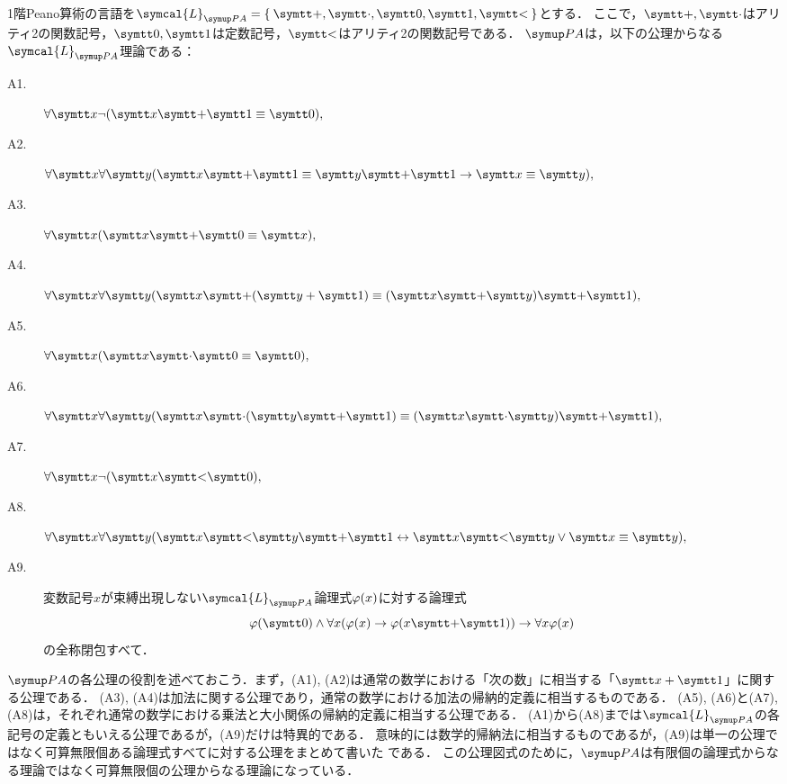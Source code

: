 \begin{Def} \label{Def:peanoarithmetic}
	1階Peano算術の言語を\(\symcal{L}_{\PA} = \Set{\obj{+}, \obj{\cdot}, \obj{0}, \obj{1}, \obj{<}}\)とする．
	ここで，\(\obj{+}, \obj{\cdot}\)はアリティ2の関数記号，\(\obj{0}, \obj{1}\)は定数記号，\(\obj{<}\)はアリティ2の関数記号である．
	\(\PA\)は，以下の公理からなる\(\symcal{L}_{\PA}\)理論である：
	\begin{description}
		\item[A1.] \(\forall \obj{x} \lnot \paren{\obj{x} \obj{+} \obj{1} \objeq \obj{0}},\)
		\item[A2.] \(\forall \obj{x} \forall \obj{y} \paren{\obj{x} \obj{+} \obj{1} \objeq \obj{y} \obj{+} \obj{1} \to \obj{x} \objeq \obj{y}},\)
		\item[A3.] \(\forall \obj{x} \paren{\obj{x} \obj{+} \obj{0} \objeq \obj{x}},\)
		\item[A4.] \(\forall \obj{x} \forall \obj{y} \paren{\obj{x} \obj{+} \paren{\obj{y} + \obj{1}} \objeq \paren{\obj{x} \obj{+} \obj{y}} \obj{+} \obj{1}},\)
		\item[A5.] \(\forall \obj{x} \paren{\obj{x} \obj{\cdot} \obj{0} \objeq \obj{0}},\)
		\item[A6.] \(\forall \obj{x} \forall \obj{y} \paren{\obj{x} \obj{\cdot} \paren{\obj{y} \obj{+} \obj{1}} \objeq \paren{\obj{x} \obj{\cdot} \obj{y}} \obj{+} \obj{1}},\)
		\item[A7.] \(\forall \obj{x} \lnot \paren{\obj{x} \obj{<} \obj{0}},\)
		\item[A8.] \(\forall \obj{x} \forall \obj{y} \paren{\obj{x} \obj{<} \obj{y} \obj{+} \obj{1} \formulaequiv \obj{x} \obj{<} \obj{y} \lor \obj{x} \objeq \obj{y}},\)
		\item[A9.] 変数記号\(x\)が束縛出現しない\(\symcal{L}_{\PA}\)論理式\(\apply{\varphi}{x}\)に対する論理式
		      \begin{equation}
			      \apply{\varphi}{\obj{0}} \land \forall x \paren{\apply{\varphi}{x} \to \apply{\varphi}{x \obj{+} \obj{1}}} \to \forall x \apply{\varphi}{x}
			      \label{eq:inductionscheme}
		      \end{equation}
		      の全称閉包すべて．
	\end{description}
\end{Def}

\(\PA\)の各公理の役割を述べておこう．まず，(A1), (A2)は通常の数学における「次の数」に相当する「\(\obj{x} + \obj{1}\)」に関する公理である．
(A3), (A4)は加法に関する公理であり，通常の数学における加法の帰納的定義に相当するものである．
(A5), (A6)と(A7), (A8)は，それぞれ通常の数学における乗法と大小関係の帰納的定義に相当する公理である．
(A1)から(A8)までは\(\symcal{L}_{\PA}\)の各記号の定義ともいえる公理であるが，(A9)だけは特異的である．
意味的には数学的帰納法に相当するものであるが，(A9)は単一の公理ではなく可算無限個ある論理式すべてに対する公理をまとめて書いた%
%
である．
この公理図式のために，\(\PA\)は有限個の論理式からなる理論ではなく可算無限個の公理からなる理論になっている．

